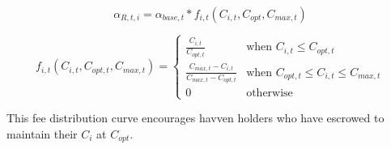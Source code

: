\begin{equation}
\alpha_{R,t,i} = \alpha_{base,t} * f_{i,t}(C_{i,t}, C_{opt}, C_{max,t})  \label{eq:6}
\end{equation}

\begin{equation}
f_{i,t}(C_{i,t}, C_{opt,t}, C_{max,t}) = 
\begin{cases}
 \frac{C_{i,t}}{C_{opt,t}} &\mbox{when } C_{i,t} \leq C_{opt,t} \\[1em]
 \frac{C_{max,t} - C_{i,t}}{C_{max,t} - C_{opt,t}} &\mbox{when } C_{opt,t} \leq C_{i,t} \leq C_{max,t} \\[1em]
 0 &\mbox{otherwise}
 \end{cases}
 \label{eq:7}
\end{equation}

\begin{center}
\end{center}

\noindent This fee distribution curve encourages havven holders who have escrowed to maintain their $C_i$ at $C_{opt}$.  \\

\newpage


